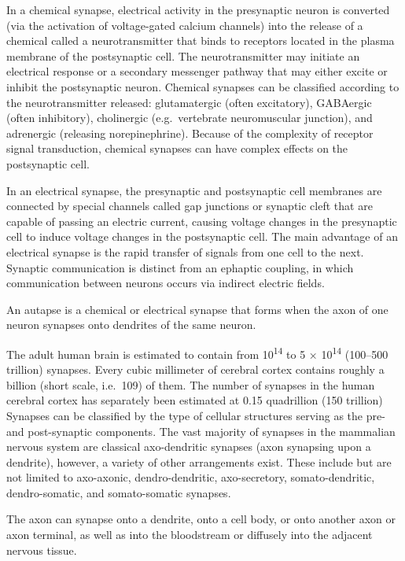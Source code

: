 In a chemical synapse, electrical activity in the presynaptic neuron is converted (via the activation of voltage-gated calcium channels) into the release of a chemical called a neurotransmitter that binds to receptors located in the plasma membrane of the postsynaptic cell. The neurotransmitter may initiate an electrical response or a secondary messenger pathway that may either excite or inhibit the postsynaptic neuron. Chemical synapses can be classified according to the neurotransmitter released: glutamatergic (often excitatory), GABAergic (often inhibitory), cholinergic (e.g.~vertebrate neuromuscular junction), and adrenergic (releasing norepinephrine). Because of the complexity of receptor signal transduction, chemical synapses can have complex effects on the postsynaptic cell.

In an electrical synapse, the presynaptic and postsynaptic cell membranes are connected by special channels called gap junctions or synaptic cleft that are capable of passing an electric current, causing voltage changes in the presynaptic cell to induce voltage changes in the postsynaptic cell. The main advantage of an electrical synapse is the rapid transfer of signals from one cell to the next.
Synaptic communication is distinct from an ephaptic coupling, in which communication between neurons occurs via indirect electric fields.

An autapse is a chemical or electrical synapse that forms when the axon of one neuron synapses onto dendrites of the same neuron.

The adult human brain is estimated to contain from 10\textsuperscript{14} to 5 × 10\textsuperscript{14} (100--500 trillion) synapses. Every cubic millimeter of cerebral cortex contains roughly a billion (short scale, i.e.~109) of them. The number of synapses in the human cerebral cortex has separately been estimated at 0.15 quadrillion (150 trillion)
Synapses can be classified by the type of cellular structures serving as the pre- and post-synaptic components. The vast majority of synapses in the mammalian nervous system are classical axo-dendritic synapses (axon synapsing upon a dendrite), however, a variety of other arrangements exist. These include but are not limited to axo-axonic, dendro-dendritic, axo-secretory, somato-dendritic, dendro-somatic, and somato-somatic synapses.

The axon can synapse onto a dendrite, onto a cell body, or onto another axon or axon terminal, as well as into the bloodstream or diffusely into the adjacent nervous tissue.

